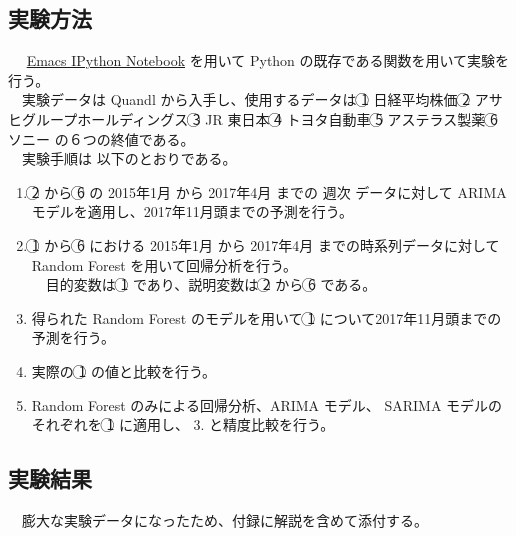 \documentclass{scrartcl}
\begin{document}
\subsection{実験方法}
\label{sec:orgc221c42}
　 \href{https://github.com/millejoh/emacs-ipython-notebook}{Emacs IPython Notebook} を用いて Python の既存である関数を用いて実験を行う。\\
　実験データは Quandl から入手し、使用するデータは \textcircled{\scriptsize 1} 日経平均株価 \textcircled{\scriptsize 2} アサヒグループホールディングス \textcircled{\scriptsize 3} JR 東日本 \textcircled{\scriptsize 4} トヨタ自動車 \textcircled{\scriptsize 5} アステラス製薬 \textcircled{\scriptsize 6} ソニー の６つの終値である。\\
　実験手順は 以下のとおりである。\\
\begin{enumerate}
\item \textcircled{\scriptsize 2} から \textcircled{\scriptsize 6} の 2015年1月 から 2017年4月 までの 週次 データに対して ARIMA モデルを適用し、2017年11月頭までの予測を行う。\\
\item \textcircled{\scriptsize 1} から \textcircled{\scriptsize 6} における 2015年1月 から 2017年4月 までの時系列データに対して Random Forest を用いて回帰分析を行う。\\
　目的変数は \textcircled{\scriptsize 1} であり、説明変数は \textcircled{\scriptsize 2} から \textcircled{\scriptsize 6} である。\\
\item 得られた Random Forest のモデルを用いて \textcircled{\scriptsize 1} について2017年11月頭までの予測を行う。\\
\item 実際の \textcircled{\scriptsize 1} の値と比較を行う。\\
\item Random Forest のみによる回帰分析、ARIMA モデル、 SARIMA モデルのそれぞれを \textcircled{\scriptsize 1} に適用し、 3. と精度比較を行う。\\
\end{enumerate}
\subsection{実験結果}
\label{sec:org8902258}
　膨大な実験データになったため、付録に解説を含めて添付する。\\
\end{document}
